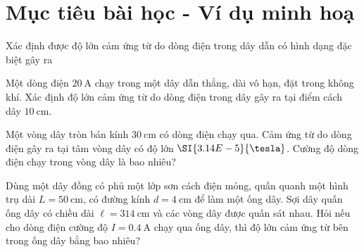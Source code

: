 \section{Mục tiêu bài học - Ví dụ minh hoạ}
\begin{dang}{Xác định được độ lớn cảm ứng từ do dòng điện trong dây dẫn có hình dạng đặc biệt gây ra}
{Một dòng điện $\SI{20}{\ampere}$ chạy trong một dây dẫn thẳng, dài vô hạn, đặt trong không khí. Xác định độ lớn cảm ứng từ do dòng điện trong dây gây ra tại điểm cách dây $\SI{10}{\centi\meter}$.

}
{

}

{Một vòng dây tròn bán kính $\SI{30}{\centi\meter}$ có dòng điện chạy qua. Cảm ứng từ do dòng điện gây ra tại tâm vòng dây có độ lớn $\SI{3.14E-5}{\tesla}$. Cường độ dòng điện chạy trong vòng dây là bao nhiêu?

}
{

}
	
	{Dùng một dây đồng có phủ một lớp sơn cách điện mỏng, quấn quanh một hình trụ dài $L=\SI{50}{\centi\meter}$, có đường kính $d=\SI{4}{\centi\meter}$ để làm một ống dây. Sợi dây quấn ống dây có chiều dài $\ell=\SI{314}{\centi\meter}$ và các vòng dây được quấn sát nhau. Hỏi nếu cho dòng điện cường độ $I=\SI{0.4}{\ampere}$ chạy qua ống dây, thì độ lớn cảm ứng từ bên trong ống dây bằng bao nhiêu?
	
}
{

}
\end{dang}

